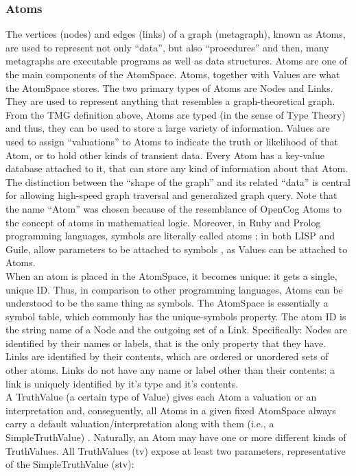 \subsubsection{Atoms}\label{sec:atoms}

The vertices (nodes) and edges (links) of a graph (metagraph), known as Atoms, are used to represent not only \enquote{data}, but also \enquote{procedures} and then, many metagraphs are executable programs as well as data structures. 
Atoms are one of the main components of the AtomSpace. Atoms, together with Values are what the AtomSpace stores.  
The two primary types of Atoms are Nodes and Links. They are used to represent anything that resembles a graph-theoretical graph. 
From the TMG definition above, Atoms are typed (in the sense of Type Theory) and thus, they can be used to store a large variety of information. 
Values are used to assign \enquote{valuations} to Atoms to indicate the truth or likelihood of that Atom, or to hold other kinds of transient data. Every Atom has a key-value database attached to it, that can store any kind of information about that Atom. The distinction between the \enquote{shape of the graph} and its related \enquote{data} is central for allowing high-speed graph traversal and generalized graph query. Note that the name \enquote{Atom} was chosen because of the resemblance of OpenCog Atoms to the concept of atoms in mathematical logic. Moreover, in Ruby and Prolog programming languages, symbols are literally called atoms \cite{wilson_2020}; in both LISP and Guile, allow parameters to be attached to symbols \cite{Lisp, lisp_symbols, starynkevitch_2019}, as Values can be attached to Atoms. \\ 

When an atom is placed in the AtomSpace, it becomes unique: it gets a single, unique ID. Thus, in comparison to other programming languages\footnotemark{}, Atoms can be understood to be the same thing as symbols. The AtomSpace is essentially a symbol table, which commonly has the unique-symbols property. 
The atom ID is the string name of a Node and the outgoing set of a Link. Specifically: Nodes are identified by their names or labels, that is the only property that they have. Links are identified by their contents, which are ordered or unordered sets of other atoms. Links do not have any name or label other than their contents: a link is uniquely identified by it's type and it's contents. \\
A TruthValue (a certain type of Value) gives each Atom a valuation or an interpretation and, conseguently, all Atoms in a given fixed AtomSpace always carry a default valuation/interpretation along with them (i.e., a SimpleTruthValue) . Naturally, an Atom may have one or more different kinds of TruthValues. 
All TruthValues (tv) expose at least two parameters, representative of the SimpleTruthValue (stv):


